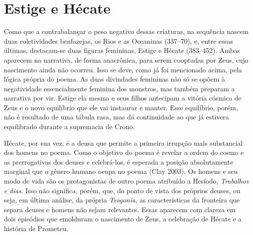
\section{Estige e Hécate}

Como que a contrabalançar o peso negativo dessas criaturas, na sequência
nascem duas coletividades benfazejas, os Rios e as Oceaninas (337--70),
e, entre essas últimas, destacam-se duas figuras femininas, Estige e
Hécate (383--452). Ambas aparecem na narrativa, de forma anacrônica, para
serem cooptadas por Zeus, cujo nascimento ainda não ocorreu. Isso se
deve, como já foi mencionado acima, pela lógica própria do poema. As
duas divindades femininas não só se opõem à negatividade essencialmente
feminina dos monstros, mas também preparam a narrativa por vir. Estige
ela mesma e seus filhos antecipam a vitória cósmica de Zeus e o novo
equilíbrio que ele vai instaurar e manter. Esse equilíbrio, porém, não é
resultado de uma tábula rasa, mas dá continuidade ao que já estivera
equilibrado durante a supremacia de Crono.

Hécate, por sua vez, é a deusa que permite a primeira irrupção mais
substancial dos homens no poema. Como o objetivo do poema é revelar a
ordem do cosmo e as prerrogativas dos deuses e celebrá-los, é esperada a
posição absolutamente marginal que o gênero humano ocupa no poema (Clay
2003). Os homens e seu modo de vida são os protagonistas de outro poema
atribuído a Hesíodo, \textit{Trabalhos e dias}. Isso não significa, porém,
que, do ponto de vista dos próprios deuses, ou seja, em última análise,
da própria \textit{Teogonia}, as características da fronteira que separa
deuses e homens não sejam relevantes. Essas aparecem com clareza em dois
episódios que emolduram o nascimento de Zeus, a celebração de Hécate e a
história de Prometeu.

